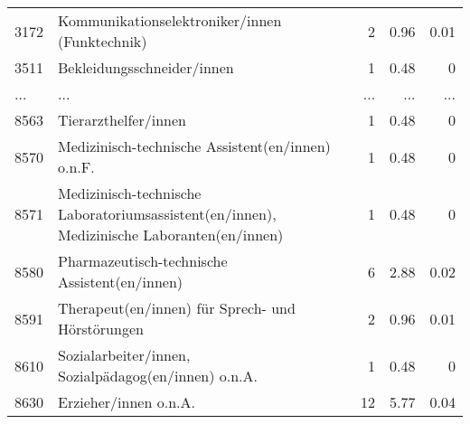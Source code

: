 \begin{longtable}{lXrrr}
        3172 & \multicolumn{1}{X}{Kommunikationselektroniker/innen (Funktechnik)} & %
          \num{2} &
          \num[round-mode=places,round-precision=2]{0.96} &
          \num[round-mode=places,round-precision=2]{0.01} \\
        3511 & \multicolumn{1}{X}{Bekleidungsschneider/innen} & %
          \num{1} &
          \num[round-mode=places,round-precision=2]{0.48} &
          \num[round-mode=places,round-precision=2]{0} \\
       ... & ... & ... & ... & ... \\
        8563 & \multicolumn{1}{X}{Tierarzthelfer/innen} & %
          \num{1} &
          \num[round-mode=places,round-precision=2]{0.48} &
          \num[round-mode=places,round-precision=2]{0} \\

        8570 & \multicolumn{1}{X}{Medizinisch-technische Assistent(en/innen) o.n.F.} & %
          \num{1} &
          \num[round-mode=places,round-precision=2]{0.48} &
          \num[round-mode=places,round-precision=2]{0} \\

        8571 & \multicolumn{1}{X}{Medizinisch-technische Laboratoriumsassistent(en/innen), Medizinische Laboranten(en/innen)} & %
          \num{1} &
          \num[round-mode=places,round-precision=2]{0.48} &
          \num[round-mode=places,round-precision=2]{0} \\

        8580 & \multicolumn{1}{X}{Pharmazeutisch-technische Assistent(en/innen)} & %
          \num{6} &
          \num[round-mode=places,round-precision=2]{2.88} &
          \num[round-mode=places,round-precision=2]{0.02} \\

        8591 & \multicolumn{1}{X}{Therapeut(en/innen) für Sprech- und Hörstörungen} & %
          \num{2} &
          \num[round-mode=places,round-precision=2]{0.96} &
          \num[round-mode=places,round-precision=2]{0.01} \\

        8610 & \multicolumn{1}{X}{Sozialarbeiter/innen, Sozialpädagog(en/innen) o.n.A.} & %
          \num{1} &
          \num[round-mode=places,round-precision=2]{0.48} &
          \num[round-mode=places,round-precision=2]{0} \\

        8630 & \multicolumn{1}{X}{Erzieher/innen o.n.A.} & %
          \num{12} &
          \num[round-mode=places,round-precision=2]{5.77} &
          \num[round-mode=places,round-precision=2]{0.04} \\


\end{longtable}

